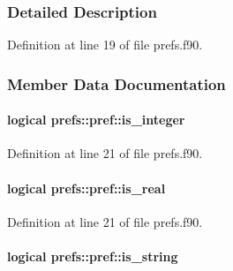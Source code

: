 \subsubsection{Detailed Description}


Definition at line 19 of file prefs.\-f90.



\subsubsection{Member Data Documentation}
\hypertarget{structprefs_1_1pref_aca5cafe098d6ef63a8970ac172f5d521}{
\paragraph[{is\-\_\-integer}]{\setlength{\rightskip}{0pt plus 5cm}logical prefs\-::pref\-::is\-\_\-integer\hspace{0.3cm}{\ttfamily [private]}}}\label{structprefs_1_1pref_aca5cafe098d6ef63a8970ac172f5d521}


Definition at line 21 of file prefs.\-f90.

\hypertarget{structprefs_1_1pref_afc74b0ae1b6b7e4a79d6397deb2e1fc8}{
\paragraph[{is\-\_\-real}]{\setlength{\rightskip}{0pt plus 5cm}logical prefs\-::pref\-::is\-\_\-real\hspace{0.3cm}{\ttfamily [private]}}}\label{structprefs_1_1pref_afc74b0ae1b6b7e4a79d6397deb2e1fc8}


Definition at line 21 of file prefs.\-f90.

\hypertarget{structprefs_1_1pref_acd8b6d8855bde737428b9134e5c89ad4}{
\paragraph[{is\-\_\-string}]{\setlength{\rightskip}{0pt plus 5cm}logical prefs\-::pref\-::is\-\_\-string\hspace{0.3cm}{\ttfamily [private]}}}\label{structprefs_1_1pref_acd8b6d8855bde737428b9134e5c89ad4}


